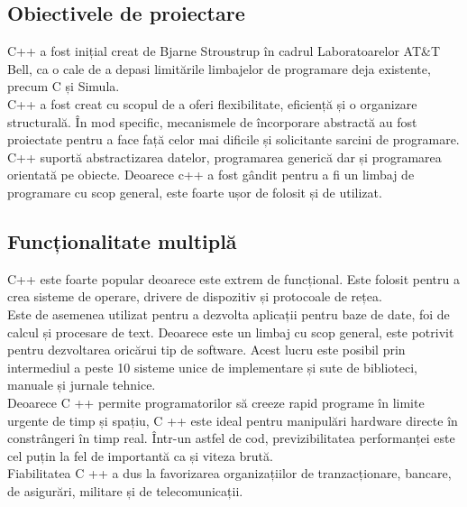 \subsection{Obiectivele de proiectare}
C++ a fost inițial creat de Bjarne Stroustrup în cadrul Laboratoarelor AT\&T Bell, ca o cale de a depasi limitările limbajelor de programare deja existente, precum C și Simula.
\vspace{6pt}
\\C++ a fost creat cu scopul de a oferi flexibilitate, eficiență și o organizare structurală. În mod specific, mecanismele de încorporare abstractă au fost proiectate pentru a face față celor mai dificile și solicitante sarcini de programare.
\vspace{6pt}
\\C++ suportă abstractizarea datelor, programarea generică dar și programarea orientată pe obiecte. Deoarece c++ a fost gândit pentru a fi un limbaj de programare cu scop general, este foarte ușor de folosit și de utilizat.

\subsection{Funcționalitate multiplă}
C++ este foarte popular deoarece este extrem de funcțional. Este folosit pentru a crea sisteme de operare, drivere de dispozitiv și protocoale de rețea.
\vspace{6pt}
\\Este de asemenea utilizat pentru a dezvolta aplicații pentru baze de date, foi de calcul și procesare de text. Deoarece este un limbaj cu scop general, este potrivit pentru dezvoltarea oricărui tip de software. Acest lucru este posibil prin intermediul a peste 10 sisteme unice de implementare și sute de biblioteci, manuale și jurnale tehnice.
\vspace{6pt}
\\Deoarece C ++ permite programatorilor să creeze rapid programe în limite urgente de timp și spațiu, C ++ este ideal pentru manipulări hardware directe în constrângeri în timp real. Într-un astfel de cod, previzibilitatea performanței este cel puțin la fel de importantă ca și viteza brută.
\vspace{6pt}
\\Fiabilitatea C ++ a dus la favorizarea organizațiilor de tranzacționare, bancare, de asigurări, militare și de telecomunicații. 

